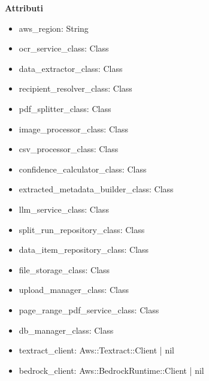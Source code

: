 \documentclass[a4paper,11pt]{article}
\begin{document}
\textbf{Attributi} 
\begin{itemize}
    \item aws_region: String
    \item ocr_service_class: Class
    \item data_extractor_class: Class
    \item recipient_resolver_class: Class
    \item pdf_splitter_class: Class
    \item image_processor_class: Class
    \item csv_processor_class: Class
    \item confidence_calculator_class: Class
    \item extracted_metadata_builder_class: Class
    \item llm_service_class: Class
    \item split_run_repository_class: Class
    \item data_item_repository_class: Class
    \item file_storage_class: Class
    \item upload_manager_class: Class
    \item page_range_pdf_service_class: Class
    \item db_manager_class: Class
    \item textract_client: Aws::Textract::Client | nil
    \item bedrock_client: Aws::BedrockRuntime::Client | nil
\end{itemize}
\end{document}
